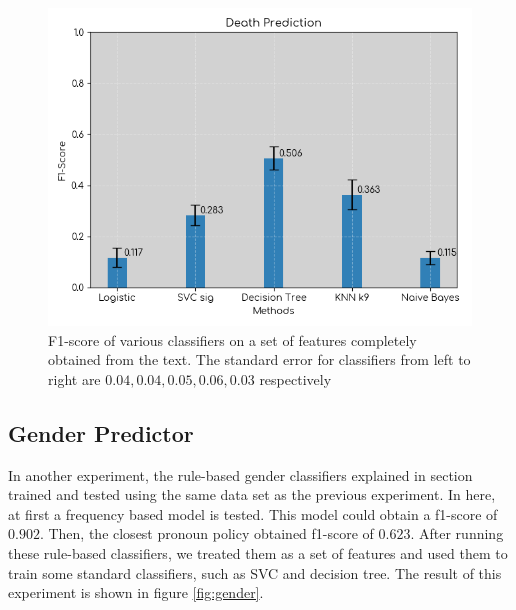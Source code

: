 \documentclass[letterpaper]{article}
\begin{document}



\begin{figure}
	\centering
	\includegraphics[scale=.60]{death_fscore_error.png} %
	\caption{F1-score of various classifiers on a set of features completely obtained from the text. The standard error for classifiers from left to right are $0.04, 0.04, 0.05, 0.06, 0.03$ respectively}
	\label{fig:f1}
\end{figure}

\subsection{Gender Predictor}

In another experiment, the rule-based gender classifiers explained in section  trained and tested using the same data set as the previous experiment. In here, at first a frequency based model is tested. This model could obtain a f1-score of $0.902$. Then, the closest pronoun policy obtained f1-score of $0.623$. After running these rule-based classifiers, we treated them as a set of features and used them to train some standard classifiers, such as SVC and decision tree. The result of this experiment is shown in figure \ref{fig:gender}.
\end{document}
